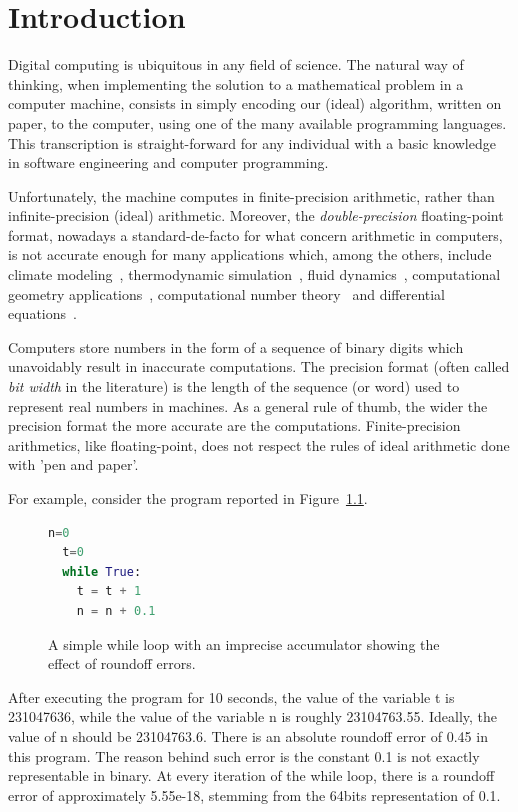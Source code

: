 
\chapter{Introduction}

\setupuuchapterbib
Digital computing is ubiquitous in any field of science.
%
The natural way of thinking, when implementing the solution to a mathematical problem in a computer machine, consists in simply encoding our (ideal) algorithm, written on paper, to the computer, using one of the many available programming languages.
%
This transcription is straight-forward for any individual with a basic knowledge in software engineering and computer programming.
%

Unfortunately, the machine computes in finite-precision arithmetic, rather than infinite-precision (ideal) arithmetic. Moreover, the \emph{double-precision} floating-point format, nowadays a standard-de-facto for what concern arithmetic in computers, is not accurate enough for many applications which, among the others, include climate modeling~\cite{climate}, thermodynamic simulation~\cite{termodynamics}, fluid dynamics~\cite{fluiddynamics, statsfluiddynamics}, computational geometry applications~\cite{javaerror}, computational number theory~\cite{futurescience} and differential equations~\cite{differentialequations}.

%
Computers store numbers in the form of a sequence of binary digits which unavoidably result in inaccurate computations.
%
The precision format (often called \emph{bit width} in the literature) is the length of the sequence (or word) used to represent real numbers in machines.
%
As a general rule of thumb, the wider the precision format the more accurate are the computations.
%
Finite-precision arithmetics, like floating-point, does not respect the rules of ideal arithmetic done with 'pen and paper'. 
%

For example, consider the program reported in Figure~\ref{fig:while}.
%
\begin{figure}[h!]
	\begin{lstlisting}[frame=single, language=Python]
  n=0
  t=0
  while True:
    t = t + 1
    n = n + 0.1
	\end{lstlisting}
	\caption{A simple while loop with an imprecise accumulator showing the effect of roundoff errors.}\label{fig:while}
\end{figure}
%
After executing the program for 10 seconds, the value of the variable t is 231047636, while the value of the variable n is roughly 23104763.55.
%
Ideally, the value of n should be 23104763.6.
%
There is an absolute roundoff error of 0.45 in this program.
%
The reason behind such error is the constant 0.1 is not exactly representable in binary. 
%
At every iteration of the while loop, there is a roundoff error of approximately 5.55e-18, stemming from the 64bits representation of 0.1. 
%

